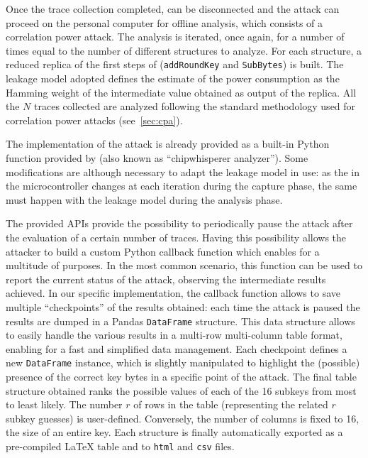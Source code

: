         Once the trace collection completed, \cw{} can be disconnected and the attack can proceed on the personal computer for offline analysis, which consists of a correlation power attack. The analysis is iterated, once again, for a number of times equal to the number of different structures to analyze. For each structure, a reduced replica of the first steps of \aess{} (\texttt{addRoundKey} and \texttt{SubBytes}) is built. The leakage model adopted defines the estimate of the power consumption as the Hamming weight of the intermediate value obtained as output of the replica. All the $N$ traces collected are analyzed following the standard methodology used for correlation power attacks (see~\ref{sec:cpa}). 
        
        The implementation of the attack is already provided as a built-in Python function provided by \cw{} (also known as ``chipwhisperer analyzer''). Some modifications are although necessary to adapt the leakage model in use: as the \sbocs{} in the microcontroller changes at each iteration during the capture phase, the same must happen with the leakage model during the analysis phase. 
        
        The provided APIs provide the possibility to periodically pause the attack after the evaluation of a certain number of traces. Having this possibility allows the attacker to build a custom Python callback function which enables for a multitude of purposes. In the most common scenario, this function can be used to report the current status of the attack, observing the intermediate results achieved. In our specific implementation, the callback function allows to save multiple ``checkpoints'' of the results obtained: each time the attack is paused the results are dumped in a Pandas \texttt{DataFrame} structure. This data structure allows to easily handle the various results in a multi-row multi-column table format, enabling for a fast and simplified data management. Each checkpoint defines a new \texttt{DataFrame} instance, which is slightly manipulated to highlight the (possible) presence of the correct key bytes in a specific point of the attack. The final table structure obtained ranks the possible values of each of the 16 subkeys from most to least likely. The number $r$ of rows in the table (representing the related $r$ subkey guesses) is user-defined. Conversely, the number of columns is fixed to 16, the size of an entire key. Each structure is finally automatically exported as a pre-compiled \LaTeX{} table and to \texttt{html} and \texttt{csv} files.

